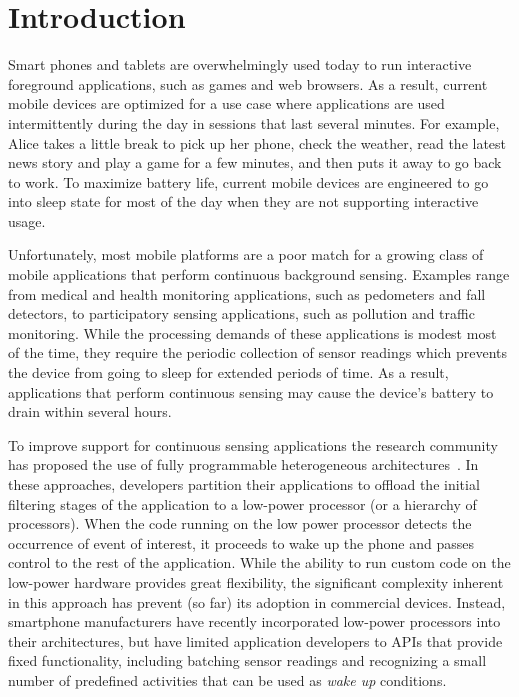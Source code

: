 
\section{\label{sec:Introduction}Introduction}

Smart phones and tablets are overwhelmingly used today to run
interactive foreground applications, such as games and web browsers.
As a result, current mobile devices are optimized for a use case where
applications are used intermittently during the day in sessions that
last several minutes.  For example, Alice takes a little break to pick
up her phone, check the weather, read the latest news story and play a
game for a few minutes, and then puts it away to go back to work.  To
maximize battery life, current mobile devices are engineered to go into
sleep state for most of the day when they are not supporting
interactive usage.

Unfortunately, most mobile platforms are a poor match for a growing
class of mobile applications that perform continuous background
sensing.  Examples range from medical and health monitoring
applications, such as pedometers and fall detectors, to participatory
sensing applications, such as pollution and traffic monitoring.  While
the processing demands of these applications is modest most of the
time, they require the periodic collection of sensor readings which
prevents the device from going to sleep for extended periods of time.
As a result, applications that perform continuous sensing may cause
the device's battery to drain within several hours.

To improve support for continuous sensing applications the research
community has proposed the use of fully programmable heterogeneous
architectures~\cite{reflex}.  In these approaches, developers
partition their applications to offload the initial filtering stages
of the application to a low-power processor (or a hierarchy of
processors).  When the code running on the low power processor detects
the occurrence of event of interest, it proceeds to wake up the phone
and passes control to the rest of the application.  While the ability
to run custom code on the low-power hardware provides great
flexibility, the significant complexity inherent in this approach has
prevent (so far) its adoption in commercial devices.  Instead,
smartphone manufacturers have recently incorporated low-power
processors into their architectures, but have limited application
developers to APIs that provide fixed functionality, including
batching sensor readings and recognizing a small number of predefined
activities that can be used as {\em wake up} conditions.

